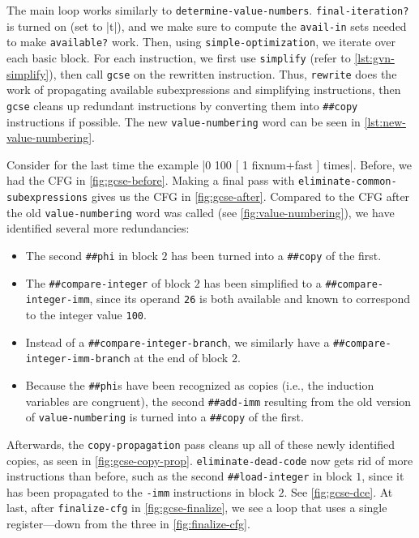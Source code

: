 
The main loop works similarly to \Verb|determine-value-numbers|.
\Verb|final-iteration?| is turned on (set to \factor|t|), and we make sure to
compute the \Verb|avail-in| sets needed to make \Verb|available?| work.
Then, using \Verb|simple-optimization|, we iterate over each basic block.
For each instruction, we first use \Verb|simplify| (refer to
\vref{lst:gvn-simplify}), then call \Verb|gcse| on the rewritten instruction.
Thus, \Verb|rewrite| does the work of propagating available subexpressions
and simplifying instructions, then \Verb|gcse| cleans up redundant
instructions by converting them into \Verb|##copy| instructions if possible.
The new \Verb|value-numbering| word can be seen in
\vref{lst:new-value-numbering}.


\begin{sloppypar}
Consider for the last time the example
%
\factor|0 100 [ 1 fixnum+fast ] times|.
%
Before, we had the \gls{CFG} in \vref{fig:gcse-before}.  Making a final pass
with \Verb|eliminate-common-subexpressions| gives us the \gls{CFG} in
\vref{fig:gcse-after}.  Compared to the \gls{CFG} after the old
\Verb|value-numbering| word was called (see \vref{fig:value-numbering}), we
have identified several more redundancies:
\begin{itemize}
  \item The second \Verb|##phi| in block $2$ has been turned into a
  \Verb|##copy| of the first.
%
  \item The \Verb|##compare-integer| of block $2$ has been simplified to
  a \Verb|##compare-integer-imm|, since its operand \Verb|26| is both
  available and known to correspond to the integer value \Verb|100|.
%
  \item Instead of a \Verb|##compare-integer-branch|, we similarly have a
  \Verb|##compare-integer-imm-branch| at the end of block $2$.
%
  \item Because the \Verb|##phi|s have been recognized as copies (i.e., the
  induction variables are congruent), the second \Verb|##add-imm| resulting
  from the old version of \Verb|value-numbering| is turned into a
  \Verb|##copy| of the first.
\end{itemize}
\end{sloppypar}


Afterwards, the \Verb|copy-propagation| pass cleans up all of these newly
identified copies, as seen in \vref{fig:gcse-copy-prop}.
\Verb|eliminate-dead-code| now gets rid of more instructions than before,
such as the second \Verb|##load-integer| in block $1$, since it has been
propagated to the \Verb|-imm| instructions in block $2$.  See
\vref{fig:gcse-dce}.  At last, after \Verb|finalize-cfg| in
\vref{fig:gcse-finalize}, we see a loop that uses a single register---down from
the three in \vref{fig:finalize-cfg}.
